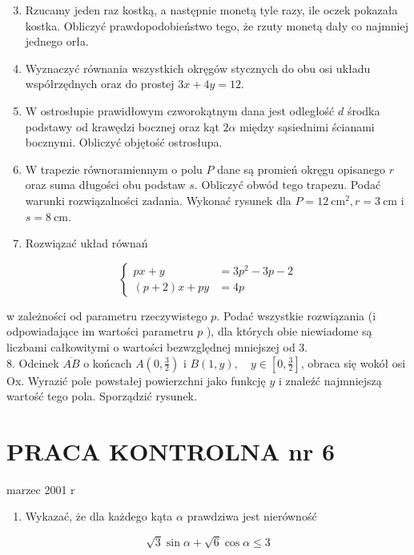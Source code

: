 \documentclass[10pt]{article}
\begin{document}
\begin{enumerate}
  \setcounter{enumi}{2}
  \item Rzucamy jeden raz kostką, a następnie monetą tyle razy, ile oczek pokazała kostka. Obliczyć prawdopodobieństwo tego, że rzuty monetą dały co najmniej jednego orła.
  \item Wyznaczyć równania wszystkich okręgów stycznych do obu osi układu współrzędnych oraz do prostej $3 x+4 y=12$.
  \item W ostrosłupie prawidłowym czworokątnym dana jest odległość $d$ środka podstawy od krawędzi bocznej oraz kąt $2 \alpha$ między sąsiednimi ścianami bocznymi. Obliczyć objętość ostrosłupa.
  \item W trapezie równoramiennym o polu $P$ dane są promień okręgu opisanego $r$ oraz suma długości obu podstaw $s$. Obliczyć obwód tego trapezu. Podać warunki rozwiązalności zadania. Wykonać rysunek dla $P=12 \mathrm{~cm}^{2}, r=3 \mathrm{~cm}$ i $s=8 \mathrm{~cm}$.
  \item Rozwiązać układ równań
\end{enumerate}

$$
\left\{\begin{aligned}
p x+y & =3 p^{2}-3 p-2 \\
(p+2) x+p y & =4 p
\end{aligned}\right.
$$

w zależności od parametru rzeczywistego $p$. Podać wszystkie rozwiązania (i odpowiadające im wartości parametru $p$ ), dla których obie niewiadome są liczbami całkowitymi o wartości bezwzględnej mniejszej od 3.\\
8. Odcinek $\overline{A B}$ o końcach $A\left(0, \frac{3}{2}\right)$ i $B(1, y), \quad y \in\left[0, \frac{3}{2}\right]$, obraca się wokół osi Ox. Wyrazić pole powstałej powierzchni jako funkcję $y$ i znaleźć najmniejszą wartość tego pola. Sporządzić rysunek.

\section*{PRACA KONTROLNA nr 6}
marzec 2001 r

\begin{enumerate}
  \item Wykazać, że dla każdego kąta $\alpha$ prawdziwa jest nierówność
\end{enumerate}

$$
\sqrt{3} \sin \alpha+\sqrt{6} \cos \alpha \leqslant 3
$$
\end{document}
